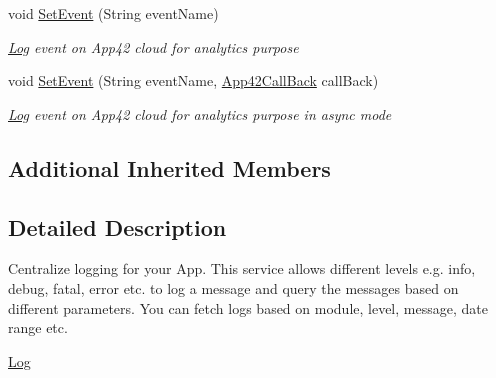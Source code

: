 \begin{DoxyCompactItemize}
void \hyperlink{classcom_1_1shephertz_1_1app42_1_1paas_1_1sdk_1_1csharp_1_1log_1_1_log_service_a71bf38b40400e7f8de3ee83f2090799d}{Set\+Event} (String event\+Name)
\begin{DoxyCompactList}\small\item\em \hyperlink{classcom_1_1shephertz_1_1app42_1_1paas_1_1sdk_1_1csharp_1_1log_1_1_log}{Log} event on App42 cloud for analytics purpose \end{DoxyCompactList}\item 
void \hyperlink{classcom_1_1shephertz_1_1app42_1_1paas_1_1sdk_1_1csharp_1_1log_1_1_log_service_adeab3abaa6a2e31b837df0f44632480c}{Set\+Event} (String event\+Name, \hyperlink{interfacecom_1_1shephertz_1_1app42_1_1paas_1_1sdk_1_1csharp_1_1_app42_call_back}{App42\+Call\+Back} call\+Back)
\begin{DoxyCompactList}\small\item\em \hyperlink{classcom_1_1shephertz_1_1app42_1_1paas_1_1sdk_1_1csharp_1_1log_1_1_log}{Log} event on App42 cloud for analytics purpose in async mode \end{DoxyCompactList}\end{DoxyCompactItemize}
\subsection*{Additional Inherited Members}


\subsection{Detailed Description}
Centralize logging for your App. This service allows different levels e.\+g. info, debug, fatal, error etc. to log a message and query the messages based on different parameters. You can fetch logs based on module, level, message, date range etc. 

\hyperlink{classcom_1_1shephertz_1_1app42_1_1paas_1_1sdk_1_1csharp_1_1log_1_1_log_service}{Log} 

